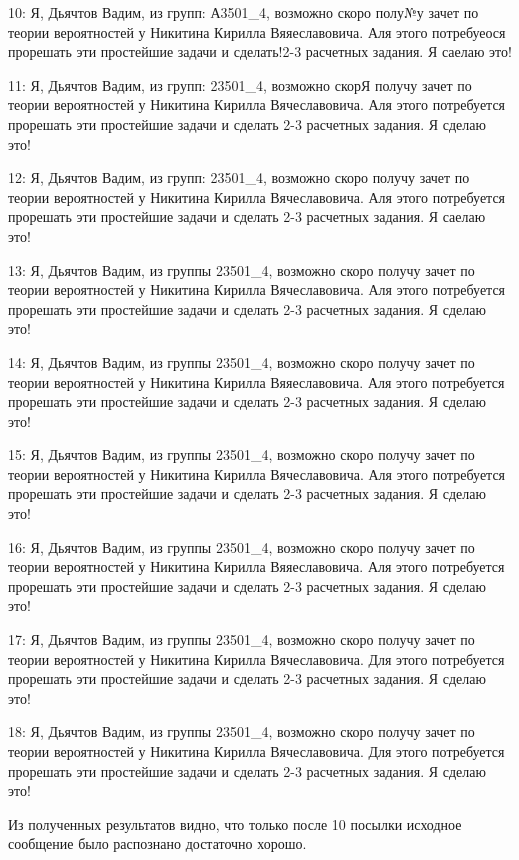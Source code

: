 {10: Я, Дьячтов Вадим, из групп: А3501\_4, возможно скоро полу№у зачет по теории вероятностей у Никитина Кирилла Вяяеславовича. Аля этого потребуеося прорешать эти простейшие задачи и сделать!2-3 расчетных задания. Я саелаю это!

11: Я, Дьячтов Вадим, из групп: 23501\_4, возможно скорЯ получу зачет по теории вероятностей у Никитина Кирилла Вячеславовича. Аля этого потребуется прорешать эти простейшие задачи и сделать 2-3 расчетных задания. Я сделаю это!

12: Я, Дьячтов Вадим, из групп: 23501\_4, возможно скоро получу зачет по теории вероятностей у Никитина Кирилла Вячеславовича. Аля этого потребуется прорешать эти простейшие задачи и сделать 2-3 расчетных задания. Я саелаю это!

13: Я, Дьячтов Вадим, из группы 23501\_4, возможно скоро получу зачет по теории вероятностей у Никитина Кирилла Вячеславовича. Аля этого потребуется прорешать эти простейшие задачи и сделать 2-3 расчетных задания. Я сделаю это!

14: Я, Дьячтов Вадим, из группы 23501\_4, возможно скоро получу зачет по теории вероятностей у Никитина Кирилла Вяяеславовича. Аля этого потребуется прорешать эти простейшие задачи и сделать 2-3 расчетных задания. Я сделаю это!

15: Я, Дьячтов Вадим, из группы 23501\_4, возможно скоро получу зачет по теории вероятностей у Никитина Кирилла Вячеславовича. Аля этого потребуется прорешать эти простейшие задачи и сделать 2-3 расчетных задания. Я сделаю это!

16: Я, Дьячтов Вадим, из группы 23501\_4, возможно скоро получу зачет по теории вероятностей у Никитина Кирилла Вяяеславовича. Аля этого потребуется прорешать эти простейшие задачи и сделать 2-3 расчетных задания. Я сделаю это!

17: Я, Дьячтов Вадим, из группы 23501\_4, возможно скоро получу зачет по теории вероятностей у Никитина Кирилла Вячеславовича. Для этого потребуется прорешать эти простейшие задачи и сделать 2-3 расчетных задания. Я сделаю это!

18: Я, Дьячтов Вадим, из группы 23501\_4, возможно скоро получу зачет по теории вероятностей у Никитина Кирилла Вячеславовича. Для этого потребуется прорешать эти простейшие задачи и сделать 2-3 расчетных задания. Я сделаю это!

}

Из полученных результатов видно, что только после 10 посылки исходное сообщение было распознано достаточно хорошо.

